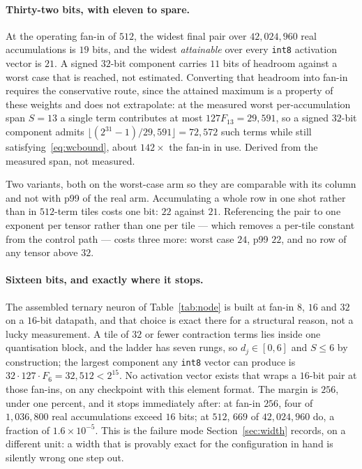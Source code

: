\documentclass[11pt]{article}
\theoremstyle{definition}
\begin{document}
\paragraph{Thirty-two bits, with eleven to spare.} At the operating fan-in of
$512$, the widest final pair over $42{,}024{,}960$ real accumulations is $19$
bits, and the widest \emph{attainable} over every \texttt{int8} activation vector
is $21$. A signed $32$-bit component carries $11$ bits of headroom against a
worst case that is reached, not estimated. Converting that headroom into fan-in
requires the conservative route, since the attained maximum is a property of
these weights and does not extrapolate: at the measured worst per-accumulation
span $S=13$ a single term contributes at most $127F_{13} = 29{,}591$, so a signed
$32$-bit component admits $\lfloor (2^{31}-1)/29{,}591 \rfloor = 72{,}572$ such
terms while still satisfying~\eqref{eq:wcbound}, about $142\times$ the fan-in in
use. Derived from the measured span, not measured.

Two variants, both on the worst-case arm so they are comparable with its column
and not with p99 of the real arm. Accumulating a whole row in one shot rather
than in $512$-term tiles costs one bit: $22$ against $21$. Referencing the pair
to one exponent per tensor rather than one per tile --- which removes a per-tile
constant from the control path --- costs three more: worst case $24$, p99 $22$,
and no row of any tensor above $32$.

\paragraph{Sixteen bits, and exactly where it stops.} The assembled ternary
neuron of Table~\ref{tab:node} is built at fan-in $8$, $16$ and $32$ on a $16$-bit
datapath, and that choice is exact there for a structural reason, not a lucky
measurement. A tile of $32$ or fewer contraction terms lies inside one
quantisation block, and the ladder has seven rungs, so $d_j \in [0,6]$ and
$S \le 6$ by construction; the largest component any \texttt{int8} vector can
produce is $32 \cdot 127 \cdot F_6 = 32{,}512 < 2^{15}$. No activation vector
exists that wraps a $16$-bit pair at those fan-ins, on any checkpoint with this
element format. The margin is $256$, under one percent, and it stops immediately
after: at fan-in $256$, four of $1{,}036{,}800$ real accumulations exceed $16$
bits; at $512$, $669$ of $42{,}024{,}960$ do, a fraction of $1.6\times10^{-5}$.
This is the failure mode Section~\ref{sec:width} records, on a different unit: a
width that is provably exact for the configuration in hand is silently wrong one
step out.
\end{document}
